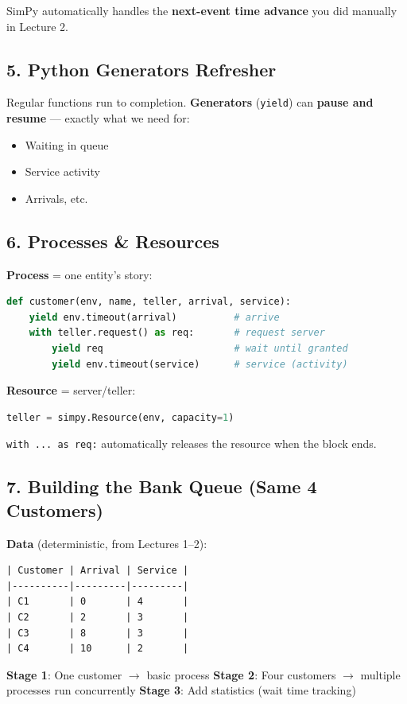 \documentclass[11pt]{article}
\begin{document}
SimPy automatically handles the \textbf{next-event time advance} you did manually in Lecture 2.

\subsection*{5. Python Generators Refresher}
Regular functions run to completion.  
\textbf{Generators} (\texttt{yield}) can \textbf{pause and resume} --- exactly what we need for:
\begin{itemize}[leftmargin=*]
\item Waiting in queue  
\item Service activity  
\item Arrivals, etc.
\end{itemize}

\subsection*{6. Processes \& Resources}
\textbf{Process} = one entity's story:
\begin{lstlisting}[language=Python]
def customer(env, name, teller, arrival, service):
    yield env.timeout(arrival)          # arrive
    with teller.request() as req:       # request server
        yield req                       # wait until granted
        yield env.timeout(service)      # service (activity)
\end{lstlisting}

\textbf{Resource} = server/teller:
\begin{lstlisting}[language=Python]
teller = simpy.Resource(env, capacity=1)
\end{lstlisting}
\texttt{with ... as req:} automatically releases the resource when the block ends.

\subsection*{7. Building the Bank Queue (Same 4 Customers)}
\textbf{Data} (deterministic, from Lectures 1--2):

\begin{verbatim}
| Customer | Arrival | Service |
|----------|---------|---------|
| C1       | 0       | 4       |
| C2       | 2       | 3       |
| C3       | 8       | 3       |
| C4       | 10      | 2       |
\end{verbatim}

\textbf{Stage 1}: One customer $\rightarrow$ basic process  
\textbf{Stage 2}: Four customers $\rightarrow$ multiple processes run concurrently  
\textbf{Stage 3}: Add statistics (wait time tracking)
\end{document}
